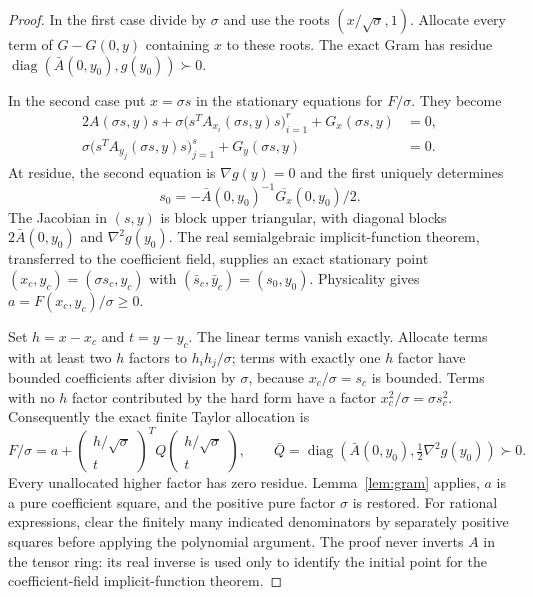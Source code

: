 \begin{proof}
In the first case divide by $\sigma$ and use the roots $(x/\sqrt\sigma,1)$. Allocate every term of $G-G(0,y)$ containing $x$ to these roots. The exact Gram has residue $\operatorname{diag}(\bar A(0,y_0),g(y_0))\succ0$.

In the second case put $x=\sigma s$ in the stationary equations for $F/\sigma$. They become
\begin{align*}
2A(\sigma s,y)s+\sigma\big(s^TA_{x_i}(\sigma s,y)s\big)_{i=1}^r
  +G_x(\sigma s,y)&=0,\\
\sigma\big(s^TA_{y_j}(\sigma s,y)s\big)_{j=1}^s
  +G_y(\sigma s,y)&=0.
\end{align*}
At residue, the second equation is $\nabla g(y)=0$ and the first uniquely determines
\[
s_0=-\bar A(0,y_0)^{-1}\overline{G_x}(0,y_0)/2.
\]
The Jacobian in $(s,y)$ is block upper triangular, with diagonal blocks
$2\bar A(0,y_0)$ and $\nabla^2g(y_0)$. The real semialgebraic implicit-function theorem, transferred to the coefficient field, supplies an exact stationary point $(x_c,y_c)=(\sigma s_c,y_c)$ with $(\bar s_c,\bar y_c)=(s_0,y_0)$. Physicality gives $a=F(x_c,y_c)/\sigma\ge0$.

Set $h=x-x_c$ and $t=y-y_c$. The linear terms vanish exactly. Allocate terms with at least two $h$ factors to $h_ih_j/\sigma$; terms with exactly one $h$ factor have bounded coefficients after division by $\sigma$, because $x_c/\sigma=s_c$ is bounded. Terms with no $h$ factor contributed by the hard form have a factor $x_c^2/\sigma=\sigma s_c^2$. Consequently the exact finite Taylor allocation is
\[
F/\sigma=a+
\begin{pmatrix}h/\sqrt\sigma\\t\end{pmatrix}^{\!T}
Q
\begin{pmatrix}h/\sqrt\sigma\\t\end{pmatrix},
\qquad
\bar Q=\operatorname{diag}\!\left(\bar A(0,y_0),\tfrac12\nabla^2g(y_0)\right)\succ0.
\]
Every unallocated higher factor has zero residue. Lemma~\ref{lem:gram} applies, $a$ is a pure coefficient square, and the positive pure factor $\sigma$ is restored. For rational expressions, clear the finitely many indicated denominators by separately positive squares before applying the polynomial argument. The proof never inverts $A$ in the tensor ring: its real inverse is used only to identify the initial point for the coefficient-field implicit-function theorem.
\end{proof}

